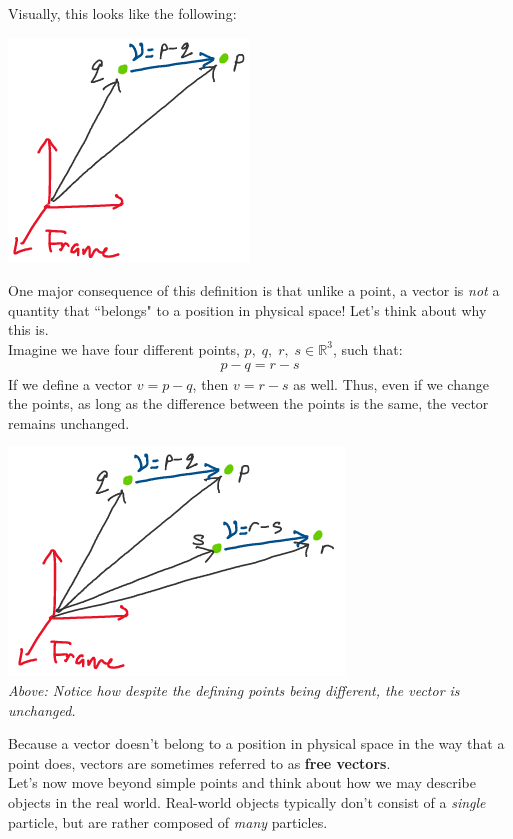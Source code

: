 \documentclass[oneside]{book}
\begin{document}
Visually, this looks like the following:
\begin{center}
    \includegraphics[scale=0.5]{images/vector.png}\\
\end{center}
One major consequence of this definition is that unlike a point, a vector is \textit{not} a quantity that ``belongs" to a position in physical space! Let's think about why this is.\\
Imagine we have four different points, $p, \; q, \; r, \; s \in \mathbb{R}^3$, such that:
\begin{align}
    p - q = r - s
\end{align}
If we define a vector $v = p-q $, then $v = r - s$ as well. Thus, even if we change the points, as long as the difference between the points is the same, the vector remains unchanged.
\begin{center}
    \includegraphics[scale=0.5]{images/twovecs.png}\\
    \textit{Above: Notice how despite the defining points being different, the vector is unchanged.}
\end{center}
Because a vector doesn't belong to a position in physical space in the way that a point does, vectors are sometimes referred to as \textbf{free vectors}.\\
Let's now move beyond simple points and think about how we may describe objects in the real world. Real-world objects typically don't consist of a \textit{single} particle, but are rather composed of \textit{many} particles.
\end{document}
